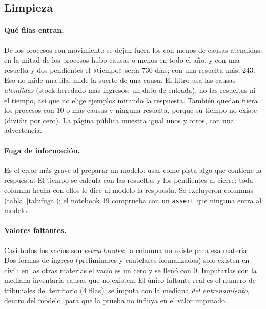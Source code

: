 \documentclass[11pt,a4paper]{article}
\begin{document}
\subsection{Limpieza}

\paragraph{Qué filas entran.} De los \nProcesos{} procesos con movimiento se dejan fuera los \nChicos{} con menos de
\minCausas{} causas atendidas: en la mitad de los procesos hubo \medianaCausas{} causas o menos en todo el año, y con una
resuelta y dos pendientes el «tiempo» sería 730 días; con una resuelta más, 243. Eso no mide una fila, mide la suerte de
una causa. El filtro usa las causas \emph{atendidas} (stock heredado más ingresos: un dato de entrada), no las resueltas ni
el tiempo, así que no elige ejemplos mirando la respuesta. También quedan fuera los \nSinResueltas{} procesos con 10 o más
causas y ninguna resuelta, porque su tiempo no existe (dividir por cero). La página pública muestra igual unos y otros,
con una advertencia.

\paragraph{Fuga de información.} Es el error más grave al preparar un modelo: usar como pista algo que contiene la
respuesta. El tiempo se calcula con las resueltas y los pendientes al cierre; toda columna hecha con ellos le dice al
modelo la respuesta. Se excluyeron \nFuga{} columnas (tabla~\ref{tab:fuga}); el notebook 19 comprueba con un
\texttt{assert} que ninguna entra al modelo.

\begin{table}[H]
  \centering\small
  \caption{Columnas excluidas por fuga de información.}
  \label{tab:fuga}
  
\end{table}

\paragraph{Valores faltantes.} Casi todos los vacíos son \emph{estructurales}: la columna no existe para esa materia. Dos
formas de ingreso (preliminares y cautelares formalizados) solo existen en civil; en las otras materias el vacío es un
cero y se llenó con 0. Imputarlas con la mediana inventaría causas que no existen. El único faltante real es el número de
tribunales del territorio (4 filas): se imputa con la mediana \emph{del entrenamiento}, dentro del modelo, para que la
prueba no influya en el valor imputado.
\end{document}
